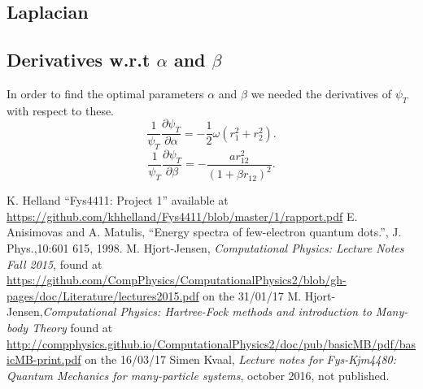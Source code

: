 \documentclass[a4paper,norsk,10pt]{article}
\newcommand{\p}{\partial}
\newcommand{\pddt}[2]{\frac{\p #1}{\p #2}}
\newcommand{\f}{\frac}
\begin{document}
\subsection{Laplacian}\label{applapn}

\subsection{Derivatives w.r.t \(\alpha\) and \(\beta\)}
In order to find the optimal parameters \(\alpha\) and \(\beta\) we needed the derivatives of \(\psi_T\) with respect to these.
\[  \f{1}{\psi_T}\pddt{\psi_T}{\alpha} = -\f{1}{2}\omega(r_1^2 + r_2^2).\]
\[  \f{1}{\psi_T}\pddt{\psi_T}{\beta} = -\f{ar_{12}^2}{(1+\beta r_{12})^2}.\]





\begin{thebibliography}{1}

  K. Helland ``Fys4411: Project 1'' available at \url{https://github.com/khhelland/Fys4411/blob/master/1/rapport.pdf}
  E. Anisimovas and A. Matulis, ``Energy spectra of few-electron quantum dots.'', J. Phys.,10:601 615, 1998.
  M. Hjort-Jensen, \emph{Computational Physics: Lecture Notes Fall 2015}, found at
  \url{https://github.com/CompPhysics/ComputationalPhysics2/blob/gh-pages/doc/Literature/lectures2015.pdf}
  on the 31/01/17
  M. Hjort-Jensen,\emph{Computational Physics: Hartree-Fock methods and introduction to Many-body Theory}
  found at \url{http://compphysics.github.io/ComputationalPhysics2/doc/pub/basicMB/pdf/basicMB-print.pdf}
  on the 16/03/17
  Simen Kvaal, \emph{Lecture notes for Fys-Kjm4480: Quantum Mechanics for many-particle systems},
  october 2016, not published.
\end{thebibliography}


      
      




\end{document}
